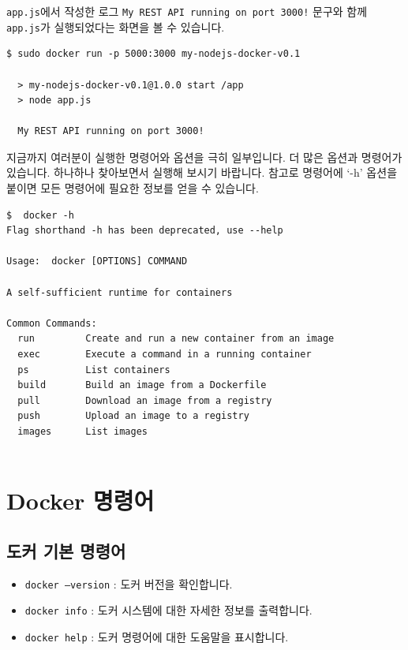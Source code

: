 \documentclass{article}
\begin{document}
\texttt{app.js}에서 작성한 로그 \texttt{My REST API running on port 3000!} 문구와 함께 \texttt{app.js}가 실행되었다는 화면을 볼 수 있습니다.

\begin{lstlisting}[language=Shell, caption={Docker 컨테이너 실행}]
  $ sudo docker run -p 5000:3000 my-nodejs-docker-v0.1

  > my-nodejs-docker-v0.1@1.0.0 start /app
  > node app.js
  
  My REST API running on port 3000!
\end{lstlisting}

지금까지 여러분이 실행한 명령어와 옵션을 극히 일부입니다. 더 많은 옵션과 명령어가 있습니다. 하나하나 찾아보면서 실행해 보시기 바랍니다. 
참고로 명령어에 `-h' 옵션을 붙이면 모든 명령어에 필요한 정보를 얻을 수 있습니다. 

\begin{lstlisting}[language=Shell, caption={Docker 명령어 도움말}]
$  docker -h
Flag shorthand -h has been deprecated, use --help

Usage:  docker [OPTIONS] COMMAND

A self-sufficient runtime for containers

Common Commands:
  run         Create and run a new container from an image
  exec        Execute a command in a running container
  ps          List containers
  build       Build an image from a Dockerfile
  pull        Download an image from a registry
  push        Upload an image to a registry
  images      List images
  
\end{lstlisting}

\clearpage
\appendix
\section{Docker 명령어}

\subsection*{도커 기본 명령어}
\begin{itemize}
    \item \texttt{docker --version} : 도커 버전을 확인합니다.
    \item \texttt{docker info} : 도커 시스템에 대한 자세한 정보를 출력합니다.
    \item \texttt{docker help} : 도커 명령어에 대한 도움말을 표시합니다.
\end{itemize}
\end{document}

